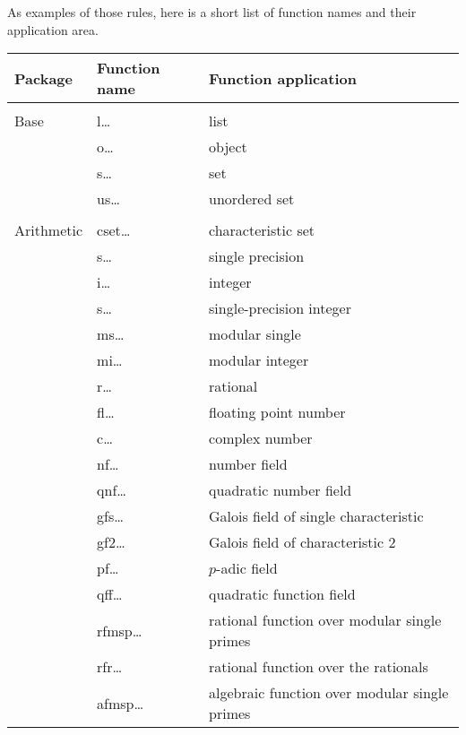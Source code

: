 As examples of those rules, here is a short list of function names and their application area.
\leer
\begin{tabular}{p{1.0in}p{1.3in}p{3.0in}}
 Package     & Function name & Function application \\ \hline
             &               &  \\
 Base        & l\ldots       & list \\
             & o\ldots       & object \\
             & s\ldots       & set \\
             & us\ldots      & unordered set \\
             &               &  \\ 
 Arithmetic  & cset\ldots    & characteristic set \\
             & s\ldots       & single precision \\
             & i\ldots       & integer \\
             & s\ldots      & single-precision integer \\
             & ms\ldots      & modular single \\
             & mi\ldots      & modular integer \\
             & r\ldots       & rational \\
             & fl\ldots      & floating point number\\
             & c\ldots       & complex number \\
             & nf\ldots      & number field \\
             & qnf\ldots     & quadratic number field \\
             & gfs\ldots     & Galois field of single characteristic \\
             & gf2\ldots     & Galois field of characteristic 2 \\
             & pf\ldots      & $p$-adic field \\ 
             & qff\ldots     & quadratic function field \\     
             & rfmsp\ldots   & rational function over modular single primes \\
             & rfr\ldots     & rational function over the rationals \\
             & afmsp\ldots   & algebraic function over modular single primes
\end{tabular}
\newpage

